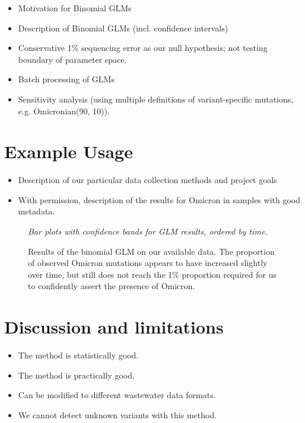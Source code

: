 \documentclass{article}
\newenvironment{tightemize}
{ \begin{itemize}
    \setlength{\itemsep}{0pt}
    \setlength{\parskip}{0pt}
    \setlength{\parsep}{0pt}     }
{ \end{itemize}                  }
\begin{document}
\begin{tightemize}
    \item Motivation for Binomial GLMs
    \item Description of Binomial GLMs (incl. confidence intervals)
    \item Conservative 1\% sequencing error as our null hypothesis; not testing boundary of parameter space.
    \item Batch processing of GLMs
    \item Sensitivity analysis (using multiple definitions of variant-specific mutations, e.g. Omicronian(90, 10)).
\end{tightemize}






\section{Example Usage}

\begin{tightemize}
    \item Description of our particular data collection methods and project goals
    \item With permission, description of the results for Omicron in samples with good metadata.
\end{tightemize}

\begin{figure}[ht!]
\vspace{2cm}
\centering
\emph{Bar plots with confidence bands for GLM results, ordered by time.}
\vspace{2cm}
\caption{Results of the binomial GLM on our available data. The proportion of observed Omicron mutations appears to have increased slightly over time, but still does not reach the 1\% proportion required for us to confidently assert the presence of Omicron.}
\label{fig:binomial_results}
\end{figure}


\section{Discussion and limitations}

\begin{tightemize}
    \item The method is statistically good.
    \item The method is practically good.
    \item Can be modified to different wastewater data formats.
    \item We cannot detect unknown variants with this method.
\end{tightemize}


{}

\end{document}
